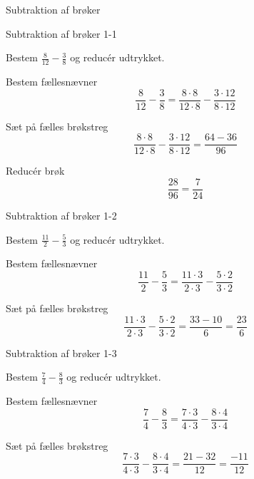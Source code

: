 \documentclass{article}
\begin{document}
Subtraktion af brøker
	\tableofcontents
	\newpage
	
	\begin{exercise}{Subtraktion af brøker 1-1}
		
		Bestem $\frac{8}{12}-\frac{3}{8}$ og reducér udtrykket.
		
		
		\hint
		
		Bestem fællesnævner
		\[
		\frac{8}{12}-\frac{3}{8}  = \frac{8 \cdot 8}{12 \cdot 8}-\frac{3 \cdot 12}{8\cdot 12} 
		\]
		
		\hint
		
		Sæt på fælles brøkstreg
		\[
		\frac{8 \cdot 8}{12 \cdot 8}-\frac{3 \cdot 12}{8\cdot 12}    = \frac{64-36}{96} 
		\]
		
		\hint
		
		Reducér brøk
		\[
		\frac{28}{96} = \frac{7}{24}
		\]
		
	\end{exercise}
	
	\newpage
	
	\begin{exercise}{Subtraktion af brøker 1-2}
		
		Bestem $\frac{11}{2}-\frac{5}{3}$ og reducér udtrykket.
		
		
		\hint
		
		Bestem fællesnævner
		\[
		\frac{11}{2}-\frac{5}{3}  = \frac{11 \cdot 3}{2 \cdot 3}-\frac{5 \cdot 2}{3\cdot 2} 
		\]
		
		\hint
		
		Sæt på fælles brøkstreg
		\[
		\frac{11 \cdot 3}{2 \cdot 3}-\frac{5 \cdot 2}{3\cdot 2}    = \frac{33-10}{6}  = \frac{23}{6}
		\]
		
		
	\end{exercise}
	\newpage
	
	\begin{exercise}{Subtraktion af brøker 1-3}
		
		Bestem $\frac{7}{4}-\frac{8}{3}$ og reducér udtrykket.
		
		
		\hint
		
		Bestem fællesnævner
		\[
		\frac{7}{4}-\frac{8}{3}  = \frac{7 \cdot 3}{4 \cdot 3}-\frac{8 \cdot 4}{3\cdot 4} 
		\]
		
		\hint
		
		Sæt på fælles brøkstreg
		\[
		\frac{7 \cdot 3}{4 \cdot 3}-\frac{8 \cdot 4}{3\cdot 4}    = \frac{21-32}{12}  = \frac{-11}{12}
		\]
		
		
	\end{exercise}
	
\end{document}
